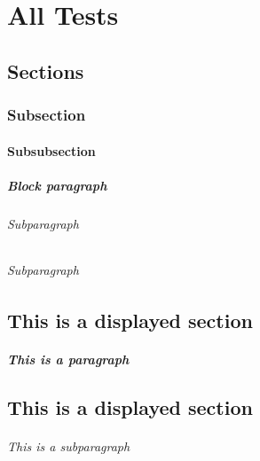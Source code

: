 \chapter{All Tests}

 \testsections

 \lorem

 \section{Sections}

 \lorem
 \subsection{Subsection}

 \lorem

 \subsubsection{Subsubsection}

 \lorem

 
 \paragraph{Block paragraph} 
 
 \lorem
 
 \subparagraph{Subparagraph} 
 
 \lorem

 \lorem

 \subparagraph{Subparagraph} 
\lorem


 \section{This is a displayed section}
 \lorem

 \paragraph{This is a paragraph}


 \lorem\lorem

 \section{This is a displayed section}

 \subparagraph{This is a subparagraph}

